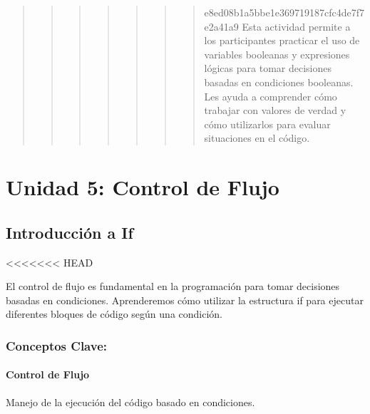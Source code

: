 \documentclass[
  a4paper,
  onepage,
  openany]{scrreprt}
\begin{document}
\begin{quote}
\begin{quote}
\begin{quote}
\begin{quote}
\begin{quote}
\begin{quote}
\begin{quote}
e8ed08b1a5bbe1e369719187cfc4de7f7e2a41a9 Esta actividad permite a los
participantes practicar el uso de variables booleanas y expresiones
lógicas para tomar decisiones basadas en condiciones booleanas. Les
ayuda a comprender cómo trabajar con valores de verdad y cómo
utilizarlos para evaluar situaciones en el código.
\end{quote}
\end{quote}
\end{quote}
\end{quote}
\end{quote}
\end{quote}
\end{quote}

\part{Unidad 5: Control de Flujo}

\hypertarget{introducciuxf3n-a-if}{%
\chapter{Introducción a If}\label{introducciuxf3n-a-if}}

\textless\textless\textless\textless\textless\textless\textless{} HEAD

El control de flujo es fundamental en la programación para tomar
decisiones basadas en condiciones. Aprenderemos cómo utilizar la
estructura if para ejecutar diferentes bloques de código según una
condición.

\hypertarget{conceptos-clave-28}{%
\section{Conceptos Clave:}\label{conceptos-clave-28}}

\hypertarget{control-de-flujo}{%
\subsection{Control de Flujo}\label{control-de-flujo}}

Manejo de la ejecución del código basado en condiciones.
\end{document}

